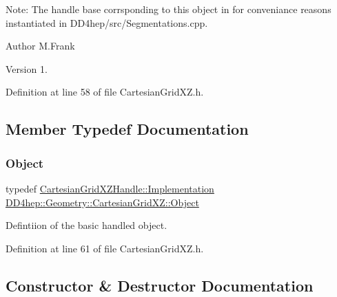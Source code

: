 Note\+: The handle base corrsponding to this object in for conveniance reasons instantiated in D\+D4hep/src/\+Segmentations.\+cpp.

\begin{DoxyAuthor}{Author}
M.\+Frank 
\end{DoxyAuthor}
\begin{DoxyVersion}{Version}
1. 
\end{DoxyVersion}


Definition at line 58 of file Cartesian\+Grid\+X\+Z.\+h.



\subsection{Member Typedef Documentation}
\hypertarget{class_d_d4hep_1_1_geometry_1_1_cartesian_grid_x_z_aba1e511c43a8b46f2524a1253c660f10}{}\label{class_d_d4hep_1_1_geometry_1_1_cartesian_grid_x_z_aba1e511c43a8b46f2524a1253c660f10} 
\subsubsection{\texorpdfstring{Object}{Object}}
{\footnotesize\ttfamily typedef \hyperlink{class_d_d4hep_1_1_handle_ad7ff728a25806079516b8965b9113f1a}{Cartesian\+Grid\+X\+Z\+Handle\+::\+Implementation} \hyperlink{class_d_d4hep_1_1_geometry_1_1_cartesian_grid_x_z_aba1e511c43a8b46f2524a1253c660f10}{D\+D4hep\+::\+Geometry\+::\+Cartesian\+Grid\+X\+Z\+::\+Object}}



Defintiion of the basic handled object. 



Definition at line 61 of file Cartesian\+Grid\+X\+Z.\+h.



\subsection{Constructor \& Destructor Documentation}
\hypertarget{class_d_d4hep_1_1_geometry_1_1_cartesian_grid_x_z_ad31b6b63475b553c5b1d7e603c5704f5}{}\label{class_d_d4hep_1_1_geometry_1_1_cartesian_grid_x_z_ad31b6b63475b553c5b1d7e603c5704f5} 
